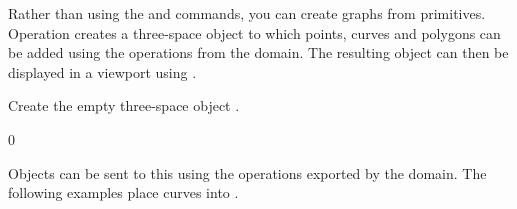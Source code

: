 Rather than using the  and  commands,
you can create \threedim{} graphs from primitives.
Operation  creates a
three-space object to which points, curves and polygons
can be added using the operations from the 
domain.
The resulting object can then be displayed in a viewport using
.

\begin{xtc}
\begin{xtccomment}
Create the empty three-space object .
\end{xtccomment}
\begin{TeXOutput}
\begin{fricasmath}{1}
0%
\end{fricasmath}
\end{TeXOutput}
\end{xtc}

Objects can be sent to this  using the operations
exported by the  domain.
The following examples place curves into .

